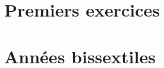 

\usepackage{parcolumns}
\setlength{\parindent}{0pt}

 
\section{Premiers exercices}


\section{Années bissextiles}



